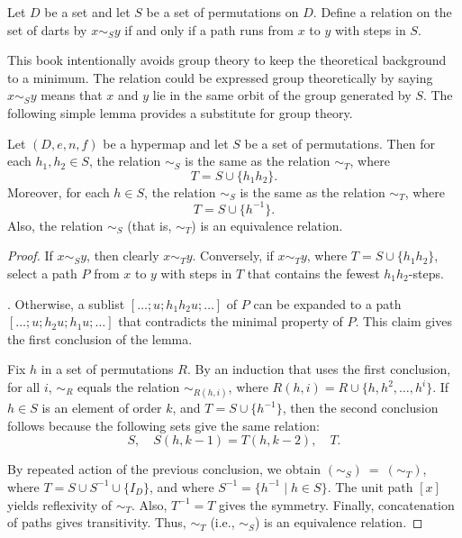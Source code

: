 \begin{definition}[$\sim_S$]
Let $D$ be a set and let $S$ be a 
set of permutations on $D$.
Define a relation on the set of darts by $x\sim_S y$ if and only if  a
path runs from $x$ to $y$ with steps in $S$.
\end{definition}
%

This book intentionally avoids group theory to keep the theoretical
background to a minimum.  The relation could be expressed group
theoretically by saying $x\sim_S y$ means that $x$ and $y$ lie in the
same orbit of the group generated by $S$.  The following simple
lemma provides a substitute for group theory.

\begin{lemma}\label{lemma:er} %
Let $(D,e,n,f)$ be a hypermap and let $S$ be a  set of permutations.
Then for each $h_1,h_2\in S$, 
the relation $\sim_S$ is the same as the relation $\sim_T$, where
\[ 
T = S \cup \{h_1h_2\}.
\] 
Moreover, for each $h\in S$, 
the relation $\sim_S$ is the same as the relation $\sim_T$, where
\[ 
T = S \cup \{h^{-1}\}.
\] 
Also,  the relation $\sim_S$ (that is, $\sim_T$) is an equivalence relation.  
%
\end{lemma}

\begin{proof} If $x\sim_S y$, then clearly $x\sim_T y$.  Conversely, if
  $x\sim_T y$, where $T = S\cup\{h_1h_2\}$, select a path $P$ from $x$
  to $y$ with steps in $T$ that contains the fewest $h_1h_2$-steps.

  .  Otherwise, a
  sublist $[\ldots;u;h_1h_2u;\ldots]$ of $P$ can be expanded to a path
  $[\ldots;u;h_2u;h_1u;\ldots]$ that contradicts the minimal property
  of $P$. This claim gives the first conclusion of the lemma.

 Fix $h$ in a set of
permutations $R$.  By an induction that uses the first conclusion, for
all $i$, $\sim_R$ equals the relation $\sim_{R(h,i)}$, where $R(h,i) =
R \cup \{h,h^2,\ldots,h^i\}$.  If $h\in S$ is an element of order $k$,
and $T = S\cup\{h^{-1}\}$, then the second conclusion follows because
the following sets give the same relation:
\[ 
S,\quad S(h,k-1) = T(h,k-2),\quad T.
\] 

By repeated action of the previous conclusion, we obtain $(\sim_S)~=~(\sim_T)$, where
$T = S\cup S^{-1}\cup \{I_D\}$, and where $S^{-1} = \{h^{-1}\mid h\in
S\}$.  The unit path $[x]$ yields reflexivity of $\sim_T$.  Also,
$T^{-1} = T$ gives the symmetry.  Finally, concatenation of paths
gives transitivity.  Thus, $\sim_T$ (i.e., $\sim_S$) is an equivalence
relation.
\end{proof}

